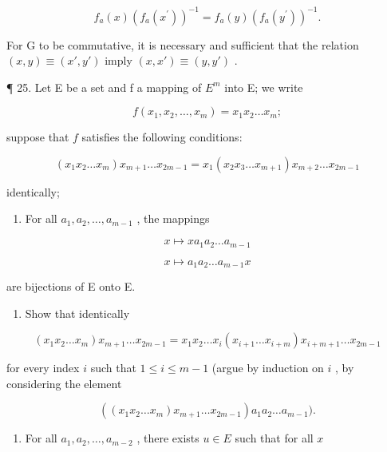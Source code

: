 \[
f _ {a} (x) \left(f _ {a} \left(x ^ {\prime}\right)\right) ^ {- 1} = f _ {a} (y) \left(f _ {a} \left(y ^ {\prime}\right)\right) ^ {- 1}.
\]

For G to be commutative, it is necessary and sufficient that the relation \((x,y)\equiv (x',y')\) imply \((x,x')\equiv (y,y')\) .

¶ 25. Let E be a set and f a mapping of \(E^{m}\) into E; we write

\[
f (x _ {1}, x _ {2}, \dots , x _ {m}) = x _ {1} x _ {2} \dots x _ {m};
\]

suppose that \(f\) satisfies the following conditions:

\[
(x _ {1} x _ {2} \dots x _ {m}) x _ {m + 1} \dots x _ {2 m - 1} = x _ {1} (x _ {2} x _ {3} \dots x _ {m + 1}) x _ {m + 2} \dots x _ {2 m - 1}\tag{1}
\]

identically;

\begin{enumerate}
\def\labelenumi{(\arabic{enumi})}
\setcounter{enumi}{1}
\tightlist
\item
  For all \(a_1, a_2, \ldots, a_{m-1}\) , the mappings
\end{enumerate}

\[
x \mapsto x a _ {1} a _ {2} \dots a _ {m - 1}
\]

\[
x \mapsto a _ {1} a _ {2} \dots a _ {m - 1} x
\]

are bijections of E onto E.

\begin{enumerate}
\def\labelenumi{(\alph{enumi})}
\tightlist
\item
  Show that identically
\end{enumerate}

\[
(x _ {1} x _ {2} \dots x _ {m}) x _ {m + 1} \dots x _ {2 m - 1} = x _ {1} x _ {2} \dots x _ {i} (x _ {i + 1} \dots x _ {i + m}) x _ {i + m + 1} \dots x _ {2 m - 1}
\]

for every index \(i\) such that \(1 \leqslant i \leqslant m - 1\) (argue by induction on \(i\) , by considering the element

\[
\left(\left(x _ {1} x _ {2} \dots x _ {m}\right) x _ {m + 1} \dots x _ {2 m - 1}\right) a _ {1} a _ {2} \dots a _ {m - 1}).
\]

\begin{enumerate}
\def\labelenumi{(\alph{enumi})}
\setcounter{enumi}{1}
\tightlist
\item
  For all \(a_1, a_2, \ldots, a_{m-2}\) , there exists \(u \in E\) such that for all \(x\)
\end{enumerate}

